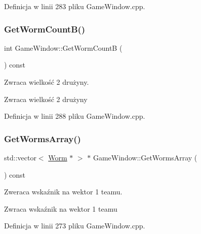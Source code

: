 Definicja w linii 283 pliku Game\+Window.\+cpp.

\mbox{\label{class_game_window_a6c6d7e7da6cfc12d33c6da6f84596b15}} 
\subsubsection{\texorpdfstring{Get\+Worm\+Count\+B()}{GetWormCountB()}}
{\footnotesize\ttfamily int Game\+Window\+::\+Get\+Worm\+CountB (\begin{DoxyParamCaption}{ }\end{DoxyParamCaption}) const}



Zwraca wielkość 2 drużyny. 

\begin{DoxyReturn}{Zwraca}
wielkość 2 drużyny 
\end{DoxyReturn}


Definicja w linii 288 pliku Game\+Window.\+cpp.

\mbox{\label{class_game_window_a7535403f5d3ab3ffe22c711665102052}} 
\subsubsection{\texorpdfstring{Get\+Worms\+Array()}{GetWormsArray()}}
{\footnotesize\ttfamily std\+::vector$<$ \mbox{\hyperlink{class_worm}{Worm}} $\ast$ $>$ $\ast$ Game\+Window\+::\+Get\+Worms\+Array (\begin{DoxyParamCaption}{ }\end{DoxyParamCaption}) const}



Zweraca wskaźnik na wektor 1 team\textquotesingle{}u. 

\begin{DoxyReturn}{Zwraca}
wskaźnik na wektor 1 team\textquotesingle{}u 
\end{DoxyReturn}


Definicja w linii 273 pliku Game\+Window.\+cpp.

\mbox{\label{class_game_window_ab9695e10e5a991a9df920911402b9272}} 
